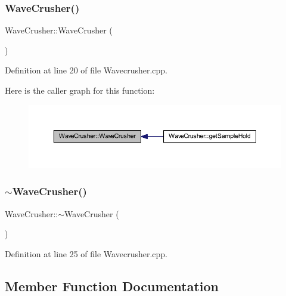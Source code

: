 \subsubsection{\texorpdfstring{Wave\+Crusher()}{WaveCrusher()}}
{\footnotesize\ttfamily Wave\+Crusher\+::\+Wave\+Crusher (\begin{DoxyParamCaption}{ }\end{DoxyParamCaption})}



Definition at line 20 of file Wavecrusher.\+cpp.

Here is the caller graph for this function\+:
\nopagebreak
\begin{figure}[H]
\begin{center}
\leavevmode
\includegraphics[width=350pt]{class_wave_crusher_a3e0ce1e58ad9fe4ab8a18fb6ecdb0db2_icgraph}
\end{center}
\end{figure}
\mbox{\label{class_wave_crusher_a464c498c7a7219aa92ba30b3951dc282}} 
\subsubsection{\texorpdfstring{$\sim$\+Wave\+Crusher()}{~WaveCrusher()}}
{\footnotesize\ttfamily Wave\+Crusher\+::$\sim$\+Wave\+Crusher (\begin{DoxyParamCaption}{ }\end{DoxyParamCaption})}



Definition at line 25 of file Wavecrusher.\+cpp.



\subsection{Member Function Documentation}
\mbox{\label{class_wave_crusher_a084b8413b14c16e4cab7f65caf9e3fd0}} 

